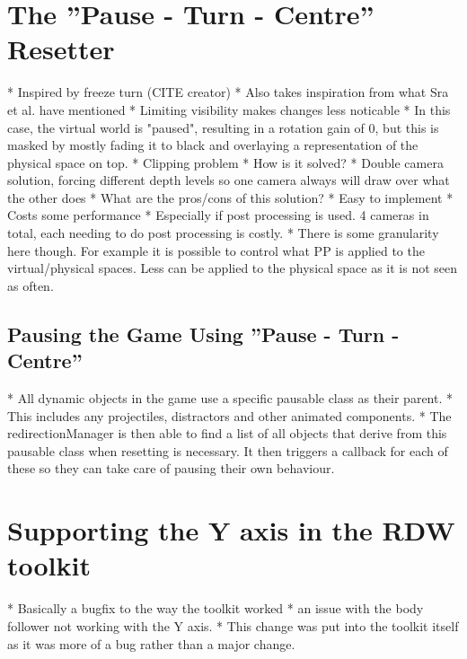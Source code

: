 \section{The ''Pause - Turn - Centre'' Resetter}\label{sec:pauseturncentre}
* Inspired by freeze turn (CITE creator)
* Also takes inspiration from what Sra et al. have mentioned
   * Limiting visibility makes changes less noticable
   * In this case, the virtual world is "paused", resulting in a rotation gain of 0, but this is masked by mostly fading it to black and overlaying a representation of the physical space on top. 
* Clipping problem
   * How is it solved?
       * Double camera solution, forcing different depth levels so one camera always will draw over what the other does
   * What are the pros/cons of this solution?
      * Easy to implement
      * Costs some performance
         * Especially if post processing is used. 4 cameras in total, each needing to do post processing is costly.
            * There is some granularity here though. For example it is possible to control what PP is applied to the virtual/physical spaces. Less can be applied to the physical space as it is not seen as often.

\subsection{Pausing the Game Using ''Pause - Turn - Centre''}
* All dynamic objects in the game use a specific pausable class as their parent. 
   * This includes any projectiles, distractors and other animated components.
* The redirectionManager is then able to find a list of all objects that derive from this pausable class when resetting is necessary. It then triggers a callback for each of these so they can take care of pausing their own behaviour. 

\section{Supporting the Y axis in the RDW toolkit}
   * Basically a bugfix to the way the toolkit worked
   * an issue with the body follower not working with the Y axis. 
   * This change was put into the toolkit itself as it was more of a bug rather than a major change.

